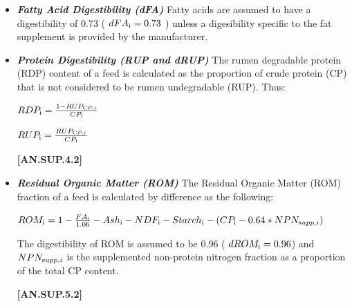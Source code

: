 \begin{refsection}
\begin{itemize}
\begin{itemize}
    \item \textbf{\textit{Fatty Acid Digestibility (dFA)} }
    \vspace{0.25cm}
   Fatty acids are assumed to have a digestibility of 0.73 ( \( dFA_{\text i} = 0.73\) ) unless a digesibility specific to the fat supplement is provided by the manufacturer. 
    \vspace{0.5cm}

    \item \textbf{\textit{Protein Digestibility (RUP and dRUP)} }
    \vspace{0.25cm}
   The rumen degradable protein (RDP) content of a feed is calculated as the proportion of crude protein (CP) that is not considered to be rumen undegradable (RUP). Thus: 
   
    \vspace{0.5cm}
    \begin{center}
    \(RDP_{\text i} = \frac{1 - RUP_{\text CP,i}}{CP_{\text i}} \)
    \end{center}
    \vspace{0.1cm}
    \begin{center}
    \(RUP_{\text i} = \frac{RUP_{\text CP,i}}{CP_{\text i}} \)
    \end{center}

    \vspace{0.5cm}
            {\raggedleft \textbf{[AN.SUP.4.2]}\par}
    \vspace{0.5cm}
    \item \textbf{\textit{Residual Organic Matter (ROM)} }
    \vspace{0.25cm}
    The Residual Organic Matter (ROM) fraction of a feed is calculated by difference as the following:
\begin{center}
    \(ROM_{\text i} = 1 - \frac{FA_{\text i}}{1.06} - Ash_{\text i} - NDF_{\text i} - Starch_{\text i} - (CP_{\text i} - 0.64*NPN_{\text supp, i}) \)
    \end{center}
\vspace{0.25cm}
The digestibility of ROM is assumed to be 0.96 ( \(dROM_{\text i} = 0.96\)) and \(NPN_{\text supp, i} \) is the supplemented non-protein nitrogen fraction as a proportion of the total CP content. 
    
    \vspace{0.5cm}
            {\raggedleft \textbf{[AN.SUP.5.2]}\par}
\end{itemize}
            \vspace{0.5cm}


\end{itemize}
\end{refsection}

